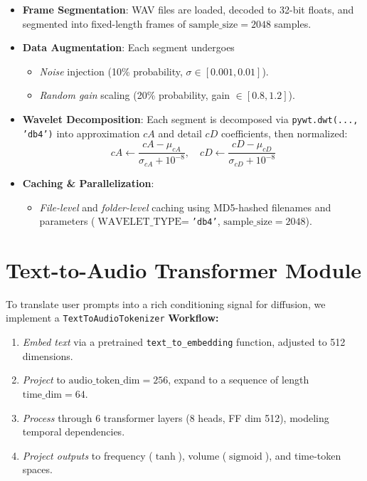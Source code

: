 \documentclass[12pt]{report}
\begin{document}
\begin{itemize}
  \item \textbf{Frame Segmentation}: WAV files are loaded, decoded to 32-bit floats, and segmented into fixed-length frames of \(\text{sample\_size}=2048\) samples.
  \item \textbf{Data Augmentation}: Each segment undergoes
    \begin{itemize}
      \item \emph{Noise} injection (10\% probability, $\sigma\in[0.001,0.01]$).
      \item \emph{Random gain} scaling (20\% probability, gain $\in[0.8,1.2]$).
    \end{itemize}
  \item \textbf{Wavelet Decomposition}: Each segment is decomposed via \texttt{pywt.dwt(..., 'db4')} into approximation \(cA\) and detail \(cD\) coefficients, then normalized:
    \[
      cA \leftarrow \frac{cA - \mu_{cA}}{\sigma_{cA} + 10^{-8}}, \quad
      cD \leftarrow \frac{cD - \mu_{cD}}{\sigma_{cD} + 10^{-8}}
    \]
  \item \textbf{Caching \& Parallelization}:  
    \begin{itemize}
      \item \emph{File-level} and \emph{folder-level} caching using MD5-hashed filenames and parameters (\(\text{WAVELET\_TYPE}=\)\texttt{'db4'}, \(\text{sample\_size}=2048\)).
    \end{itemize}
\end{itemize}

\section{Text-to-Audio Transformer Module}

To translate user prompts into a rich conditioning signal for diffusion, we implement a \texttt{TextToAudioTokenizer}
\noindent\textbf{Workflow:}
\begin{enumerate}
  \item \emph{Embed text} via a pretrained \texttt{text\_to\_embedding} function, adjusted to 512 dimensions.
  \item \emph{Project} to \(\text{audio\_token\_dim}=256\), expand to a sequence of length \(\text{time\_dim}=64\).
  \item \emph{Process} through 6 transformer layers (8 heads, FF dim 512), modeling temporal dependencies.
  \item \emph{Project outputs} to frequency (\(\tanh\)), volume (\(\operatorname{sigmoid}\)), and time-token spaces.
\end{enumerate}
\end{document}
